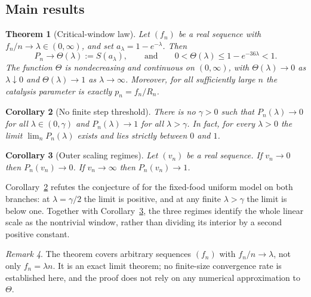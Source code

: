 \documentclass[11pt,reqno]{amsart}
\theoremstyle{plain}
\newtheorem{theorem}{Theorem}[section]
\newtheorem{corollary}[theorem]{Corollary}
\theoremstyle{definition}
\theoremstyle{remark}
\newtheorem{remark}[theorem]{Remark}
\numberwithin{equation}{section}
\newcommand{\clam}{a_\lambda}
\begin{document}
\subsection{Main results}

\begin{theorem}[Critical-window law]\label{thm:main}
Let $(f_n)$ be a real sequence with $f_n/n\to\lambda\in(0,\infty)$, and set $\clam=1-e^{-\lambda}$. Then
\begin{equation}\label{eq:main}
P_n\longrightarrow\Theta(\lambda):=S(\clam),\qquad\text{and}\qquad 0<\Theta(\lambda)\le1-e^{-36\lambda}<1.
\end{equation}
The function $\Theta$ is nondecreasing and continuous on $(0,\infty)$, with $\Theta(\lambda)\to0$ as $\lambda\downarrow0$ and $\Theta(\lambda)\to1$ as $\lambda\to\infty$. Moreover, for all sufficiently large $n$ the catalysis parameter is exactly $p_n=f_n/R_n$.
\end{theorem}

\begin{corollary}[No finite step threshold]\label{cor:nostep}
There is no $\gamma>0$ such that $P_n(\lambda)\to0$ for all $\lambda\in(0,\gamma)$ and $P_n(\lambda)\to1$ for all $\lambda>\gamma$. In fact, for every $\lambda>0$ the limit $\lim_nP_n(\lambda)$ exists and lies strictly between $0$ and $1$.
\end{corollary}

\begin{corollary}[Outer scaling regimes]\label{cor:outer}
Let $(v_n)$ be a real sequence. If $v_n\to0$ then $P_n(v_n)\to0$. If $v_n\to\infty$ then $P_n(v_n)\to1$.
\end{corollary}

Corollary~\ref{cor:nostep} refutes the conjecture of \cite[Eq.~(21)]{hordijk2016variable} for the fixed-food uniform model on both branches: at $\lambda=\gamma/2$ the limit is positive, and at any finite $\lambda>\gamma$ the limit is below one. Together with Corollary~\ref{cor:outer}, the three regimes identify the whole linear scale as the nontrivial window, rather than dividing its interior by a second positive constant.

\begin{remark}
The theorem covers arbitrary sequences $(f_n)$ with $f_n/n\to\lambda$, not only $f_n=\lambda n$. It is an exact limit theorem; no finite-size convergence rate is established here, and the proof does not rely on any numerical approximation to $\Theta$.
\end{remark}
\end{document}
